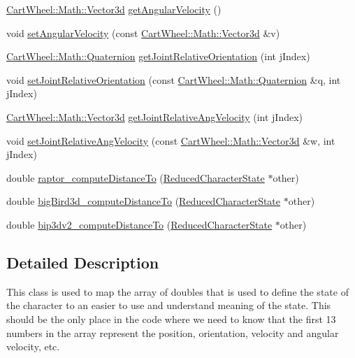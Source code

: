 \begin{DoxyCompactItemize}
\item 
\hyperlink{classCartWheel_1_1Math_1_1Vector3d}{CartWheel::Math::Vector3d} \hyperlink{classCartWheel_1_1Core_1_1ReducedCharacterState_a560c490811f41f52ca0432a09a1d986b}{getAngularVelocity} ()
\item 
void \hyperlink{classCartWheel_1_1Core_1_1ReducedCharacterState_aae884d8d365bea8c9ca4e0b6b59bc25c}{setAngularVelocity} (const \hyperlink{classCartWheel_1_1Math_1_1Vector3d}{CartWheel::Math::Vector3d} \&v)
\item 
\hyperlink{classCartWheel_1_1Math_1_1Quaternion}{CartWheel::Math::Quaternion} \hyperlink{classCartWheel_1_1Core_1_1ReducedCharacterState_a18bde4f9c2d2de2534d56e896c7c3ccd}{getJointRelativeOrientation} (int jIndex)
\item 
void \hyperlink{classCartWheel_1_1Core_1_1ReducedCharacterState_a84a0a6a1f1525c630cf4bb8549a0eca5}{setJointRelativeOrientation} (const \hyperlink{classCartWheel_1_1Math_1_1Quaternion}{CartWheel::Math::Quaternion} \&q, int jIndex)
\item 
\hyperlink{classCartWheel_1_1Math_1_1Vector3d}{CartWheel::Math::Vector3d} \hyperlink{classCartWheel_1_1Core_1_1ReducedCharacterState_aba39bc3ede0f1a4ef73eb6d5b2ebde64}{getJointRelativeAngVelocity} (int jIndex)
\item 
void \hyperlink{classCartWheel_1_1Core_1_1ReducedCharacterState_ae11d4640b70a6168de15e676ab65977f}{setJointRelativeAngVelocity} (const \hyperlink{classCartWheel_1_1Math_1_1Vector3d}{CartWheel::Math::Vector3d} \&w, int jIndex)
\item 
double \hyperlink{classCartWheel_1_1Core_1_1ReducedCharacterState_ac18db83455bbd84305928cdf1330ceb1}{raptor\_\-computeDistanceTo} (\hyperlink{classCartWheel_1_1Core_1_1ReducedCharacterState}{ReducedCharacterState} $\ast$other)
\item 
double \hyperlink{classCartWheel_1_1Core_1_1ReducedCharacterState_aae04c76522e0b5f914651f9e12ef3395}{bigBird3d\_\-computeDistanceTo} (\hyperlink{classCartWheel_1_1Core_1_1ReducedCharacterState}{ReducedCharacterState} $\ast$other)
\item 
double \hyperlink{classCartWheel_1_1Core_1_1ReducedCharacterState_abee0378601df6a0b6c35928cf8d5e052}{bip3dv2\_\-computeDistanceTo} (\hyperlink{classCartWheel_1_1Core_1_1ReducedCharacterState}{ReducedCharacterState} $\ast$other)
\end{DoxyCompactItemize}


\subsection{Detailed Description}
This class is used to map the array of doubles that is used to define the state of the character to an easier to use and understand meaning of the state. This should be the only place in the code where we need to know that the first 13 numbers in the array represent the position, orientation, velocity and angular velocity, etc. 

